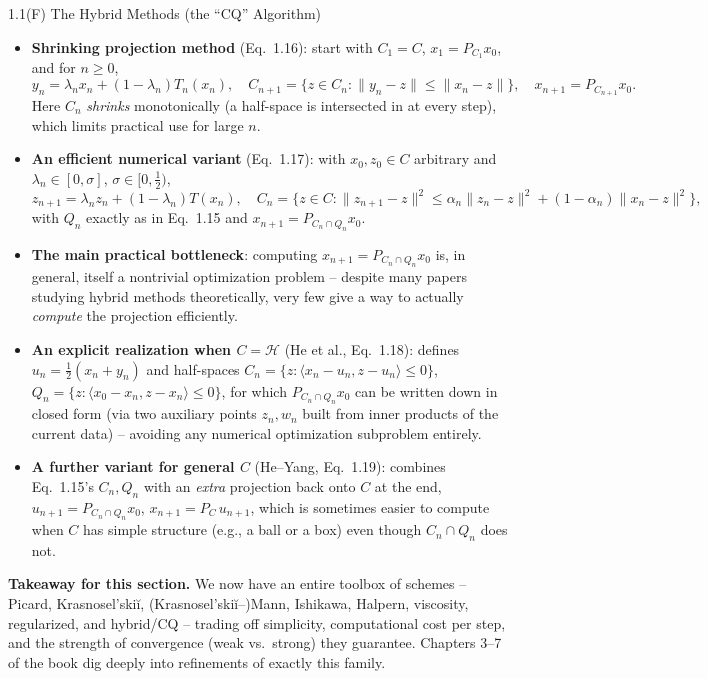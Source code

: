 \documentclass[aspectratio=169,10pt]{beamer}
\newcommand{\Hil}{\mathcal{H}}
\begin{document}
\begin{frame}[allowframebreaks]{1.1(F) The Hybrid Methods (the ``CQ'' Algorithm)}
\begin{itemize}
  \item \textbf{Shrinking projection method} (Eq.\ 1.16): start with
    $C_1=C$, $x_1=P_{C_1}x_0$, and for $n\ge0$,
  \[
    y_n=\lambda_n x_n+(1-\lambda_n)T_n(x_n), \quad
    C_{n+1}=\{z\in C_n:\|y_n-z\|\le\|x_n-z\|\}, \quad
    x_{n+1}=P_{C_{n+1}}x_0.
  \]
    Here $C_n$ \emph{shrinks} monotonically (a half-space is intersected
    in at every step), which limits practical use for large $n$.

\framebreak

  \item \textbf{An efficient numerical variant} (Eq.\ 1.17): with
    $x_0,z_0\in C$ arbitrary and $\lambda_n\in[0,\sigma]$,
    $\sigma\in[0,\tfrac12)$,
  \[
    z_{n+1}=\lambda_n z_n+(1-\lambda_n)T(x_n), \quad
    C_n=\{z\in C:\|z_{n+1}-z\|^2\le\alpha_n\|z_n-z\|^2+(1-\alpha_n)\|x_n-z\|^2\},
  \]
    with $Q_n$ exactly as in Eq.\ 1.15 and $x_{n+1}=P_{C_n\cap Q_n}x_0$.

  \item \textbf{The main practical bottleneck}: computing
    $x_{n+1}=P_{C_n\cap Q_n}x_0$ is, in general, itself a nontrivial
    optimization problem -- despite many papers studying hybrid methods
    theoretically, very few give a way to actually \emph{compute} the
    projection efficiently.

\framebreak

  \item \textbf{An explicit realization when $C=\Hil$} (He et al., Eq.\
    1.18): defines $u_n=\tfrac12(x_n+y_n)$ and half-spaces
    $C_n=\{z:\langle x_n-u_n,z-u_n\rangle\le0\}$,
    $Q_n=\{z:\langle x_0-x_n,z-x_n\rangle\le0\}$, for which
    $P_{C_n\cap Q_n}x_0$ can be written down in closed form (via two
    auxiliary points $z_n,w_n$ built from inner products of the current
    data) -- avoiding any numerical optimization subproblem entirely.
  \item \textbf{A further variant for general $C$} (He--Yang, Eq.\ 1.19):
    combines Eq.\ 1.15's $C_n,Q_n$ with an \emph{extra} projection back
    onto $C$ at the end,
    $u_{n+1}=P_{C_n\cap Q_n}x_0$, $x_{n+1}=P_C\,u_{n+1}$, which is
    sometimes easier to compute when $C$ has simple structure (e.g., a
    ball or a box) even though $C_n\cap Q_n$ does not.
\end{itemize}

\framebreak

\textbf{Takeaway for this section.} We now have an entire toolbox of
schemes -- Picard, Krasnosel'ski\u{i}, (Krasnosel'ski\u{i}--)Mann,
Ishikawa, Halpern, viscosity, regularized, and hybrid/CQ -- trading off
simplicity, computational cost per step, and the strength of convergence
(weak vs.\ strong) they guarantee. Chapters 3--7 of the book dig deeply
into refinements of exactly this family.

\end{frame}
\end{document}
